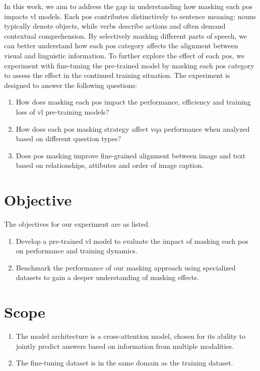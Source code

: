 In this work, we aim to address the gap in understanding how masking each \acrfull{pos} impacts \acrshort{vl} models.
Each \acrshort{pos} contributes distinctively to sentence meaning: nouns typically denote objects, while verbs describe actions and often demand contextual comprehension.
By selectively masking different parts of speech, we can better understand how each \acrshort{pos} category affects the alignment between visual and linguistic information.
To further explore the effect of each \acrshort{pos}, we experiment with fine-tuning the pre-trained model by masking each \acrshort{pos} category to assess the effect in the continued training situation.
The experiment is designed to answer the following questions:
\begin{enumerate}
    \item How does masking each \acrshort{pos} impact the performance, efficiency and training loss of \acrshort{vl} pre-training models?
    \item How does each \acrshort{pos} masking strategy affect \acrfull{vqa} performance when analyzed based on different question types?
    \item Does \acrshort{pos} masking improve fine-grained alignment between image and text based on relationships, attibutes and order of image caption.
\end{enumerate}

\section{Objective}
The objectives for our experiment are as listed.
\begin{enumerate}
    \item Develop a pre-trained \acrshort{vl} model to evaluate the impact of masking each \acrshort{pos} on performance and training dynamics.
    \item Benchmark the performance of our masking approach using specialized datasets to gain a deeper understanding of masking effects.
\end{enumerate}

\section{Scope}
\begin{enumerate}
    \item The model architecture is a cross-attention model, chosen for its ability to jointly predict answers based on information from multiple modalities.
    \item The fine-tuning dataset is in the same domain as the training dataset.
\end{enumerate}


